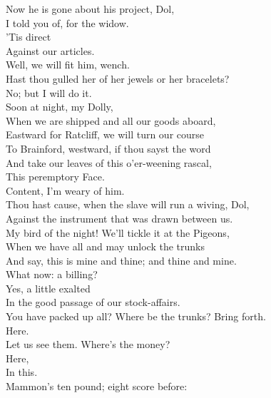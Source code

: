 \documentclass[a4paper,oneside,12pt]{memoir}
\begin{document}
\begin{drama*}
\subtlespeaks Now he is gone about his project, Dol,\\
I told you of, for the widow.\\
\dolspeaks {} 'Tis direct\\
Against our articles.\\
\subtlespeaks {} Well, we will fit him, wench.\\
Hast thou gulled her of her jewels or her bracelets?\\
\dolspeaks No; but I will do it.\\
\subtlespeaks {} Soon at night, my Dolly,\\
When we are shipped and all our goods aboard,\\
Eastward for Ratcliff, we will turn our course\\
To Brainford, westward, if thou sayst the word\\
And take our leaves of this o'er-weening rascal,\\
This peremptory Face.\\
\dolspeaks {} Content, I'm weary of him.\\
\subtlespeaks Thou hast cause, when the slave will run a wiving, Dol,\\
Against the instrument that was drawn between us.\\
My bird of the night! We'll tickle it at the Pigeons,\\
When we have all and may unlock the trunks\\
And say, this is mine and thine; and thine and mine.\\
\facespeaks What now: a billing?\\
\subtlespeaks {} Yes, a little exalted\\
In the good passage of our stock-affairs.\\
\facespeaks You have packed up all? Where be the trunks? Bring forth.\\
\subtlespeaks Here.\\
\facespeaks {} Let us see them. Where's the money?\\
\subtlespeaks {} Here,\\
In this.\\
\facespeaks {} Mammon's ten pound; eight score before:\\

\end{drama*}
\end{document}
